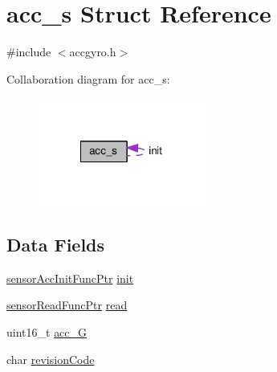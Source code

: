 \hypertarget{structacc__s}{\section{acc\+\_\+s Struct Reference}
\label{structacc__s}
}


{\ttfamily \#include $<$accgyro.\+h$>$}



Collaboration diagram for acc\+\_\+s\+:\nopagebreak
\begin{figure}[H]
\begin{center}
\leavevmode
\includegraphics[width=156pt]{structacc__s__coll__graph}
\end{center}
\end{figure}
\subsection*{Data Fields}
\begin{DoxyCompactItemize}
\item 
\hyperlink{sensor_8h_ab365c4bf39db272deff4d52b7a14b65f}{sensor\+Acc\+Init\+Func\+Ptr} \hyperlink{structacc__s_a9f24736f8ffd4ef6d58710dac801459e}{init}
\item 
\hyperlink{sensor_8h_af1826dc6e1452a4b956e54abacce853e}{sensor\+Read\+Func\+Ptr} \hyperlink{structacc__s_af4998a3db3e078f1d27bae030d73edb2}{read}
\item 
uint16\+\_\+t \hyperlink{structacc__s_a2f6d54fed86fd1f7fd228262696b5776}{acc\+\_\+G}
\item 
char \hyperlink{structacc__s_a5c44f57a5845243db9ecc08698dc5dd9}{revision\+Code}
\end{DoxyCompactItemize}


